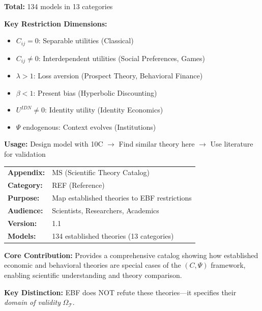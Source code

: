 \begin{tcolorbox}[colback=yellow!10!white, colframe=orange!75!black,
    title=\textbf{Quick Reference: Theory Catalog}]

\textbf{Total:} 134 models in 13 categories

\textbf{Key Restriction Dimensions:}
\begin{itemize}[nosep]
    \item $C_{ij} = 0$: Separable utilities (Classical)
    \item $C_{ij} \neq 0$: Interdependent utilities (Social Preferences, Games)
    \item $\lambda > 1$: Loss aversion (Prospect Theory, Behavioral Finance)
    \item $\beta < 1$: Present bias (Hyperbolic Discounting)
    \item $U^{IDN} \neq 0$: Identity utility (Identity Economics)
    \item $\Psi$ endogenous: Context evolves (Institutions)
\end{itemize}

\textbf{Usage:} Design model with 10C $\rightarrow$ Find similar theory here $\rightarrow$ Use literature for validation

\end{tcolorbox}

\begin{tcolorbox}[colback=blue!5!white, colframe=blue!75!black,
    title=\textbf{Appendix MS: REF-MODELSPACE}]

\begin{tabular}{@{}ll@{}}
\textbf{Appendix:} & MS (Scientific Theory Catalog) \\
\textbf{Category:} & REF (Reference) \\
\textbf{Purpose:} & Map established theories to EBF restrictions \\
\textbf{Audience:} & Scientists, Researchers, Academics \\
\textbf{Version:} & 1.1 \\
\textbf{Models:} & 134 established theories (13 categories) \\
\end{tabular}

\tcblower

\textbf{Core Contribution:} Provides a comprehensive catalog showing how
established economic and behavioral theories are special cases of the
$(C, \Psi)$ framework, enabling scientific understanding and theory comparison.

\textbf{Key Distinction:} EBF does NOT refute these theories—it specifies
their \textit{domain of validity} $\Omega_\mathcal{T}$.

\end{tcolorbox}

